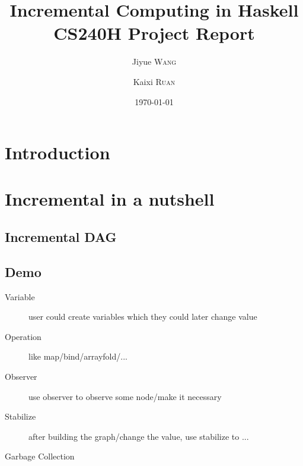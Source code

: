\documentclass[a4paper, twocolumn]{article}
\title{Incremental Computing in Haskell\\CS240H Project Report}
\author[]{Jiyue \textsc{Wang}}
\author[]{Kaixi \textsc{Ruan}}
\date{\today}
\begin{document}
\maketitle 

\section{Introduction}

\section{Incremental in a nutshell }

\subsection{Incremental DAG}

\subsection{Demo}
\begin{description}
  \item [Variable] user could create variables which they could later change value 
  \item [Operation] like map/bind/arrayfold/...
  \item [Observer] use observer to observe some node/make it necessary
  \item [Stabilize] after building the graph/change the value, use stabilize to ...
  \item [Garbage Collection] 
\end{description}
 
\end{document}
